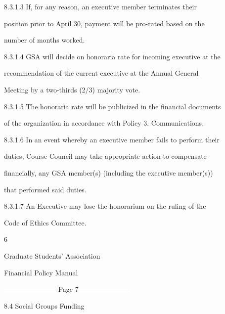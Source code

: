     8.3.1.3      If,   for   any   reason,   an   executive   member   terminates   their  

         position  prior  to  April  30,  payment  will  be  pro-rated  based  on  the  

         number of months worked.   



    8.3.1.4      GSA will decide on honoraria rate for incoming executive at the  

         recommendation  of  the  current  executive  at  the  Annual  General  

         Meeting by a two-thirds (2/3) majority vote.   



    8.3.1.5      The honoraria rate will be publicized in the financial documents  

         of the organization in accordance with Policy 3. Communications.  



    8.3.1.6      In an event whereby an executive member fails to perform their  

         duties,  Course  Council  may  take  appropriate  action  to  compensate  

         financially, any GSA member(s) (including the executive member(s))  

         that performed said duties.   



    8.3.1.7      An  Executive  may  lose  the  honorarium  on  the  ruling  of  the  

         Code of Ethics Committee.  



           



                                                      6  

                                   

                                   

                                 Graduate Students’ Association  

                                     Financial Policy Manual  

  


----------------------- Page 7-----------------------

                          8.4       Social Groups Funding   



